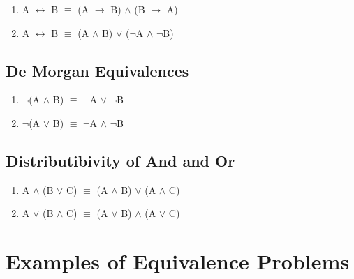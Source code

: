 \documentclass{report}
\begin{document}
\begin{enumerate}



  \item A $\leftrightarrow$ B $\equiv$ (A $\to$ B) $\land$ (B $\to$ A)

  \item A $\leftrightarrow$ B $\equiv$ (A $\land$ B) $\lor$ ($\neg$A $\land$ $\neg$B)



\end{enumerate}



\subsection{De Morgan Equivalences}



\begin{enumerate}



  \item $\neg$(A $\land$ B) $\equiv$ $\neg$A $\lor$ $\neg$B

  \item $\neg$(A $\lor$ B) $\equiv$ $\neg$A $\land$ $\neg$B



\end{enumerate}



\subsection{Distributibivity of And and Or}

\begin{enumerate}



  \item A $\land$ (B $\lor$ C) $\equiv$ (A $\land$ B) $\lor$ (A $\land$ C)

  \item A $\lor$ (B $\land$ C) $\equiv$ (A $\lor$ B) $\land$ (A $\lor$ C)



\end{enumerate}



\section{Examples of Equivalence Problems}
\end{document}
